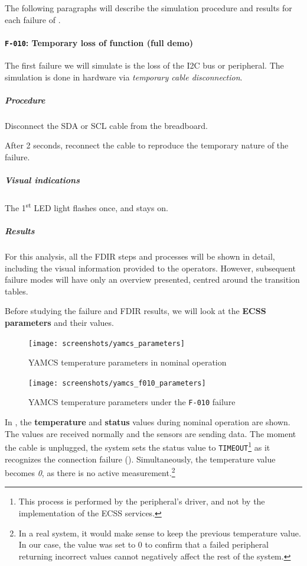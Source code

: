 \documentclass[a4paper,nobib]{tufte-book}
\begin{document}
\clearpage
The following paragraphs will describe the simulation procedure and results for each failure of .

\paragraph{\textbf{\texttt{F-010}: Temporary loss of function (full demo)}}\hspace{0pt}

The first failure we will simulate is the loss of the \acs{I2C} bus or peripheral. The simulation is done in hardware via \emph{temporary cable disconnection}.

\subparagraph{Procedure}
\begin{compactenum}
	\item Disconnect the \acs{SDA} or \acs{SCL} cable from the breadboard.
	\item After 2 seconds, reconnect the cable to reproduce the temporary nature of the failure.
\end{compactenum}

\subparagraph{Visual indications} The 1\textsuperscript{st} \acs{LED} light flashes once, and stays on.

\subparagraph{Results}
For this analysis, all the \acs{FDIR} steps and processes will be shown in detail, including the visual information provided to the operators. However, subsequent failure modes will have only an overview presented, centred around the transition tables.

Before studying the failure and \acs{FDIR} results, we will look at the \textbf{\acs{ECSS} parameters} and their values.

\begin{figure}[h]
	\centering
	\texttt{[image: screenshots/yamcs\_parameters]}
	\caption{\acs{YAMCS} temperature parameters in nominal operation}
	\label{fig:yamcsparametersnominal}
\end{figure}

\begin{figure}[h]
	\centering
	\texttt{[image: screenshots/yamcs\_f010\_parameters]}
	\caption{\acs{YAMCS} temperature parameters under the \texttt{F-010} failure}
	\label{fig:yamcsparametersf010}
\end{figure}

In , the \textbf{temperature} and \textbf{status} values during nominal operation are shown. The values are received normally and the sensors are sending data. The moment the cable is unplugged, the system sets the status value to \texttt{TIMEOUT}\footnote{This process is performed by the peripheral's driver, and not by the implementation of the \acs{ECSS} services.} as it recognizes the connection failure (). Simultaneously, the temperature value becomes \emph{0}, as there is no active measurement.\footnote{In a real system, it would make sense to keep the previous temperature value. In our case, the value was set to 0 to confirm that a failed peripheral returning incorrect values cannot negatively affect the rest of the system.}
\end{document}
